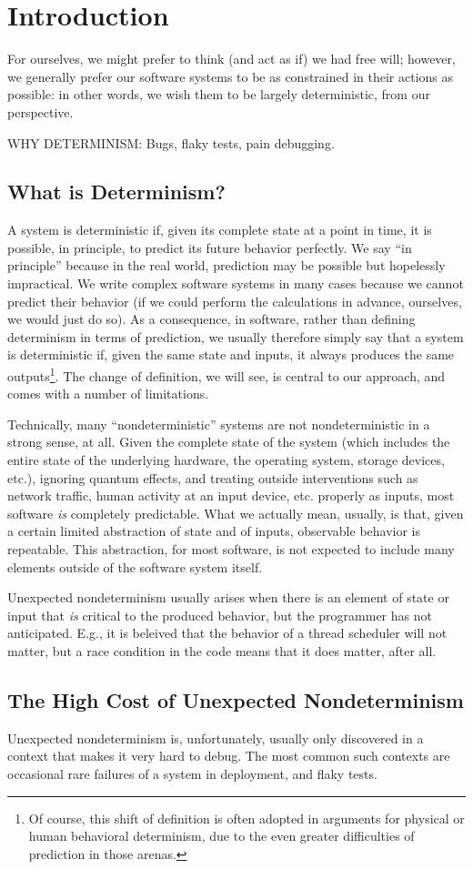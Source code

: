 \section{Introduction}

For ourselves, we might prefer to think (and act as if) we had free
will; however, we generally prefer our software systems to be as
constrained in their actions as possible:  in other words, we wish
them to be largely deterministic, from our perspective.

WHY DETERMINISM:  Bugs, flaky tests, pain debugging.

\subsection{What is Determinism?}

A system is deterministic if, given its complete state at a point in
time, it is possible, in principle, to predict its future behavior
perfectly.  We say ``in principle'' because in the real world,
prediction may be possible but hopelessly impractical.  We write
complex software systems in many cases because we cannot predict their
behavior (if we could perform the calculations in advance, ourselves,
we would just do so).  As a consequence, in software, rather than
defining determinism in terms of prediction, we usually therefore
simply say that a system is deterministic if, given the same state and
inputs, it always produces the same outputs\footnote{Of course, this
  shift of definition is often adopted in arguments for physical or
  human behavioral determinism, due to the even greater difficulties
  of prediction in those arenas.}.  The change of
definition, we will see, is central to our approach, and comes with a
number of limitations.

Technically, many ``nondeterministic'' systems are not
nondeterministic in a strong sense, at all.  Given the complete state
of the system (which includes the entire state of the underlying
hardware, the operating system, storage devices, etc.), ignoring
quantum effects, and treating outside interventions such as network
traffic, human activity at an input device, etc. properly as inputs,
most software \emph{is} completely predictable.  What we actually
mean, usually, is that, given a certain limited abstraction of state
and of inputs, observable behavior is repeatable.  This abstraction,
for most software, is not expected to include many elements outside of
the software system itself.

Unexpected nondeterminism usually arises when there is an element of
state or input that \emph{is} critical to the produced behavior, but
the programmer has not anticipated.  E.g., it is beleived that the
behavior of a thread scheduler will not matter, but a race condition
in the code means that it does matter, after all.

\subsection{The High Cost of Unexpected Nondeterminism}

Unexpected nondeterminism is, unfortunately, usually only discovered
in a context that makes it very hard to debug.   The most common such
contexts are occasional rare failures of a system in deployment, and
flaky tests.